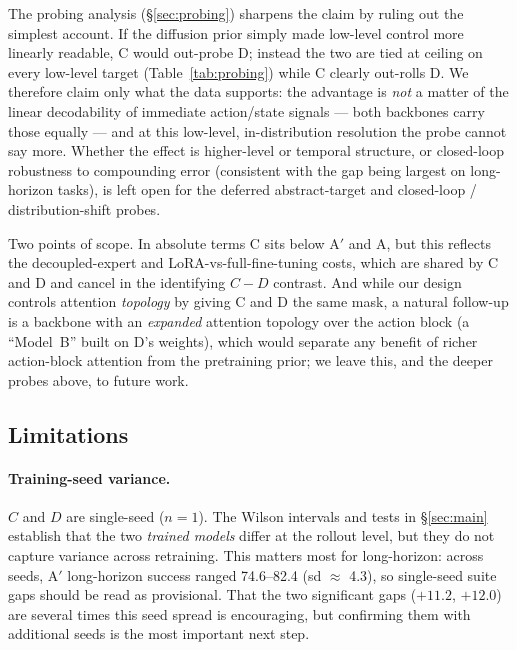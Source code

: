 \documentclass{article}
\begin{document}
The probing analysis (\S\ref{sec:probing}) sharpens the claim by ruling out the
simplest account. If the diffusion prior simply made low-level control more
linearly readable, C would out-probe D; instead the two are tied at ceiling on
every low-level target (Table~\ref{tab:probing}) while C clearly out-rolls D. We
therefore claim only what the data supports: the advantage is \emph{not} a matter
of the linear decodability of immediate action/state signals --- both backbones
carry those equally --- and at this low-level, in-distribution resolution the probe
cannot say more. Whether the effect is higher-level or temporal structure, or
closed-loop robustness to compounding error (consistent with the gap being largest
on long-horizon tasks), is left open for the deferred abstract-target and
closed-loop / distribution-shift probes.

Two points of scope. In absolute terms C sits below A$'$ and A, but this reflects
the decoupled-expert and LoRA-vs-full-fine-tuning costs, which are shared by C and
D and cancel in the identifying $C-D$ contrast. And while our design controls
attention \emph{topology} by giving C and D the same mask, a natural follow-up is
a backbone with an \emph{expanded} attention topology over the action block (a
``Model~B'' built on D's weights), which would separate any benefit of richer
action-block attention from the pretraining prior; we leave this, and the deeper
probes above, to future work.

\subsection{Limitations}
\label{sec:limits}

\paragraph{Training-seed variance.} $C$ and $D$ are single-seed ($n{=}1$). The
Wilson intervals and tests in \S\ref{sec:main} establish that the two \emph{trained
models} differ at the rollout level, but they do not capture variance across
retraining. This matters most for long-horizon: across seeds, A$'$ long-horizon
success ranged 74.6--82.4 (sd $\approx$ 4.3), so single-seed suite gaps should be
read as provisional. That the two significant gaps ($+11.2$, $+12.0$) are several
times this seed spread is encouraging, but confirming them with additional seeds is
the most important next step.
\end{document}
